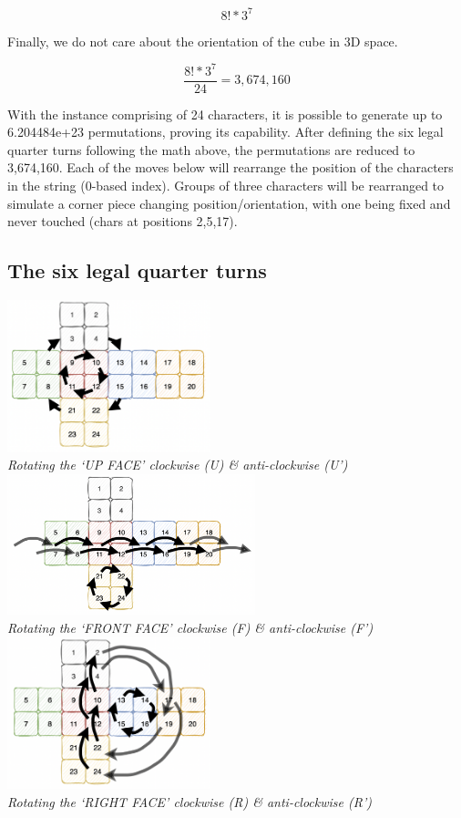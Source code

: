 \documentclass[a4paper]{article}
\begin{document}
\[8!*3^7\]

\par Finally, we do not care about the orientation of the cube in 3D space.

\[\frac{8!*3^7}{24} = 3,674,160\]

\par With the instance comprising of 24 characters, it is possible to generate up to 6.204484e+23 permutations, proving its capability. After defining the six legal quarter turns following the math above, the permutations are reduced to 3,674,160. Each of the moves below will rearrange the position of the characters in the string (0-based index). Groups of three characters will be rearranged to simulate a corner piece changing position/orientation, with one being fixed and never touched (chars at positions 2,5,17).

\subsection{The six legal quarter turns}

\begin{center}
\includegraphics[width=5.9cm]{upface-clockwise.png}\\
\emph{Rotating the ‘UP FACE’ clockwise (U) \& anti-clockwise (U')}
\includegraphics[width=7.2cm]{frontface-clockwise.png}\\
\emph{Rotating the ‘FRONT FACE’ clockwise (F) \& anti-clockwise (F')}
\includegraphics[width=5.9cm]{rightface-clockwise.png}\\
\emph{Rotating the ‘RIGHT FACE’ clockwise (R) \& anti-clockwise (R')}
\end{center}
\end{document}
